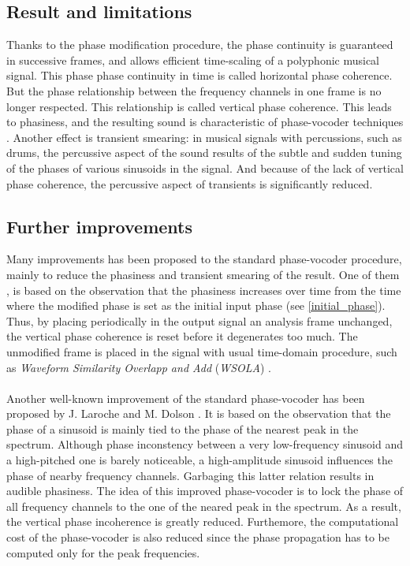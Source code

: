 \documentclass[letterpaper]{article}
\theoremstyle{definition}
\theoremstyle{remark}
\theoremstyle{plain}
\begin{document}
\subsection{Result and limitations}
Thanks to the phase modification procedure, the phase continuity is guaranteed
in successive frames, and allows efficient time-scaling of a polyphonic musical
signal. This phase phase continuity in time is called horizontal phase
coherence. But the phase relationship between the frequency channels in one
frame is no longer respected. This relationship is called vertical phase
coherence. This leads to phasiness, and the resulting sound is characteristic of
phase-vocoder techniques \citep{Laroche1999}. Another effect is transient
smearing: in musical signals with percussions, such as drums, the percussive
aspect of the sound results of the subtle and sudden tuning of the phases of
various sinusoids in the signal. And because of the lack of vertical phase
coherence, the percussive aspect of transients is significantly reduced.

\paragraph{}

\subsection{Further improvements}
Many improvements has been proposed to the standard phase-vocoder procedure,
mainly to reduce the phasiness and transient smearing of the result. One of
them \citep{Dorran_audiotime_scale, Kraft2012ImprovedPT}, is based on the
observation that the phasiness increases over time from the time where the
modified phase is set as the initial input phase (see \eqref{initial_phase}).
Thus, by placing periodically in the output signal an analysis frame unchanged,
the vertical phase coherence is reset before it degenerates too much. The
unmodified frame is placed in the signal with usual time-domain procedure,
such as \emph{Waveform Similarity Overlapp and Add} (\emph{WSOLA})
\citep{Verhelst1993}.

\paragraph{}
Another well-known improvement of the standard phase-vocoder has been proposed
by J. Laroche and M. Dolson \citep{Laroche1999}. It is based on the observation
that the phase of a sinusoid is mainly tied to the phase of the nearest peak
in the spectrum. Although phase inconstency between a very low-frequency
sinusoid and a high-pitched one is barely noticeable, a high-amplitude sinusoid
influences the phase of nearby frequency channels. Garbaging this latter
relation results in audible phasiness. The idea of this improved phase-vocoder
is to lock the phase of all frequency channels to the one of the neared peak
in the spectrum. As a result, the vertical phase incoherence is greatly reduced.
Furthemore, the computational cost of the phase-vocoder is also reduced since
the phase propagation has to be computed only for the peak frequencies.
\end{document}
